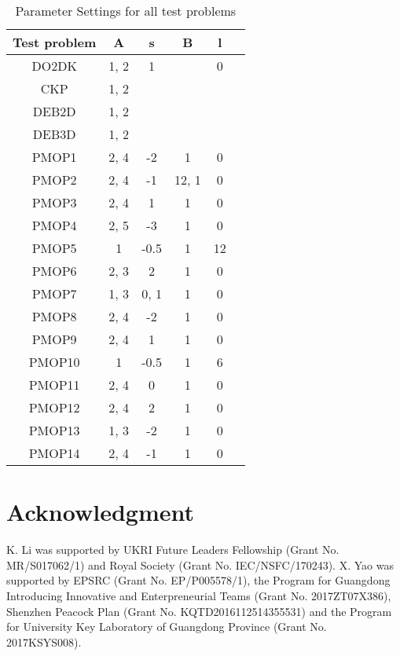 \documentclass[11pt]{article}
\begin{document}
\begin{table}[htbp]
  \centering
  \caption{Parameter Settings for all test problems}
    \begin{tabular}{c|c|c|c|c|c}
    \hline
    Test problem & A\protect\footnotemark[3]    & s     & B    & l  \\
    \hline
    DO2DK & 1, 2 & 1   &   & 0 \\
    \hline
    CKP & 1, 2 & & & &\\
    \hline
    DEB2D & 1, 2 &  &  &  &  \\
    \hline
    DEB3D & 1, 2 &  &  &  &  \\
    \hline
    PMOP1 & 2, 4 & -2    & 1      & 0 \\
    \hline
    PMOP2 & 2, 4 & -1    & 12, 1  & 0 \\
    \hline
    PMOP3 & 2, 4 & 1     & 1      & 0 \\
    \hline
    PMOP4 & 2, 5 & -3    & 1      & 0 \\
    \hline
    PMOP5 & 1  & -0.5  & 1      & 12 \\
    \hline
    PMOP6 & 2, 3 & 2     & 1      & 0 \\
    \hline
    PMOP7 & 1, 3 & 0, 1  & 1      & 0 \\
    \hline
    PMOP8 & 2, 4 & -2    & 1      & 0 \\
    \hline
    PMOP9 & 2, 4 & 1     & 1      & 0 \\
    \hline
    PMOP10 & 1  & -0.5  & 1     & 6 \\
    \hline
    PMOP11 & 2, 4 & 0     & 1     & 0 \\
    \hline
    PMOP12 & 2, 4 & 2     & 1     & 0 \\
    \hline
    PMOP13 & 1, 3 & -2    & 1     & 0 \\
    \hline
    PMOP14 & 2, 4 & -1    & 1     & 0 \\
    \hline
    \end{tabular}%
  \label{tab:addlabel}%
\end{table}%
\protect{}

\section*{Acknowledgment}
K. Li was supported by UKRI Future Leaders Fellowship (Grant No. MR/S017062/1) and Royal Society (Grant No. IEC/NSFC/170243).   X. Yao was supported by EPSRC (Grant No. EP/P005578/1), the Program for Guangdong Introducing Innovative and Enterpreneurial Teams (Grant No. 2017ZT07X386), Shenzhen Peacock Plan (Grant No. KQTD2016112514355531) and the Program for University Key Laboratory of Guangdong Province (Grant No. 2017KSYS008). 



\end{document}
